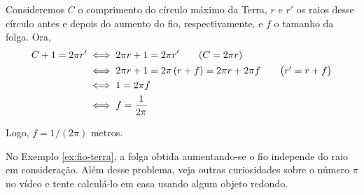 \begin{solution}
Consideremos $C$ o comprimento do círculo máximo da Terra, $r$ e $r'$ os raios desse círculo antes e depois do aumento do fio, respectivamente, e $f$ o tamanho da folga. Ora,
%
\begin{align*}
C+1=2\pi r' & \iff 2\pi r+1=2\pi r' \tag*{$\prn{C = 2\pi r}$}\\
	& \iff 2\pi r+1= 2\pi \prn{r+f} = 2\pi r+2\pi f \tag*{$\prn{r' = r+f}$}\\
	& \iff 1 = 2\pi f\\
	& \iff f = \dfrac{1}{2\pi}
\end{align*}
\begin{comment}
\begin{tabular}{ l l l }
$C+1=2\pi r'$ & $\iff 2\pi r+1=2\pi r'$& $\prn{C = 2\pi r}$\\
	 & $\iff 2\pi r+1= 2\pi \prn{r+f} = 2\pi r+2\pi f$& $\prn{r' = r+f}$\\
	 & $\iff 1 = 2\pi f$ &  \\
	 & $\iff f = \dfrac{1}{2\pi}$  & 
\end{tabular}
\end{comment}
Logo, $f = 1/(2\pi)$ metros.
\end{solution}

\noindent No Exemplo \ref{ex:fio-terra}, a folga obtida aumentando-se o fio independe do raio em consideração. Além desse problema, veja outras curiosidades sobre o número $\pi$ no vídeo  e tente calculá-lo em casa usando algum objeto redondo.